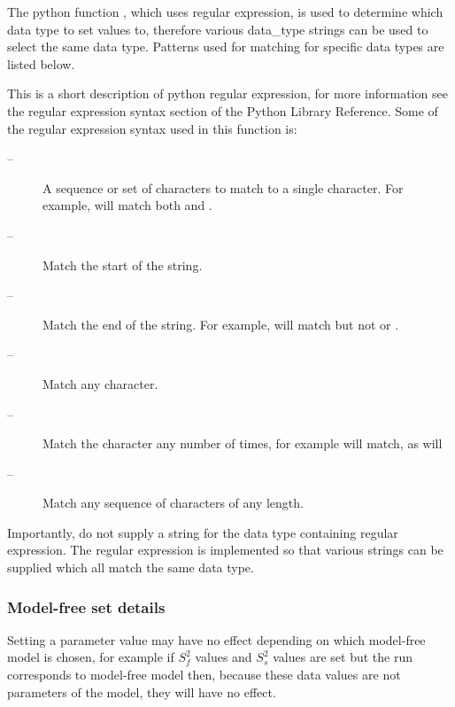  The python function , which uses regular expression, is used to determine which data type to set values to, therefore various data\_type strings can be used to select the same data type.  Patterns used for matching for specific data types are listed below. 
  

 This is a short description of python regular expression, for more information see the regular expression syntax section of the Python Library Reference.  Some of the regular expression syntax used in this function is: 
  

 \begin{description} 
 \item[\quotecmd{[]} --]  A sequence or set of characters to match to a single character.  For example,  will match both  and .  
 \item[\quotecmd{\^{}} --]  Match the start of the string.  
 \item[\quotecmd{\$} --]  Match the end of the string.  For example,  will match  but not  or .  
 \item[ --]  Match any character.  
 \item[ --]  Match the character  any number of times, for example  will match, as will   
 \item[ --]  Match any sequence of characters of any length.  
 \end{description} 
  

 Importantly, do not supply a string for the data type containing regular expression.  The regular expression is implemented so that various strings can be supplied which all match the same data type. 
  

  
 \subsubsection{Model-free set details} 

 Setting a parameter value may have no effect depending on which model-free model is chosen, for example if $S^2_f$ values and $S^2_s$ values are set but the run corresponds to model-free model  then, because these data values are not parameters of the model, they will have no effect. 
  

